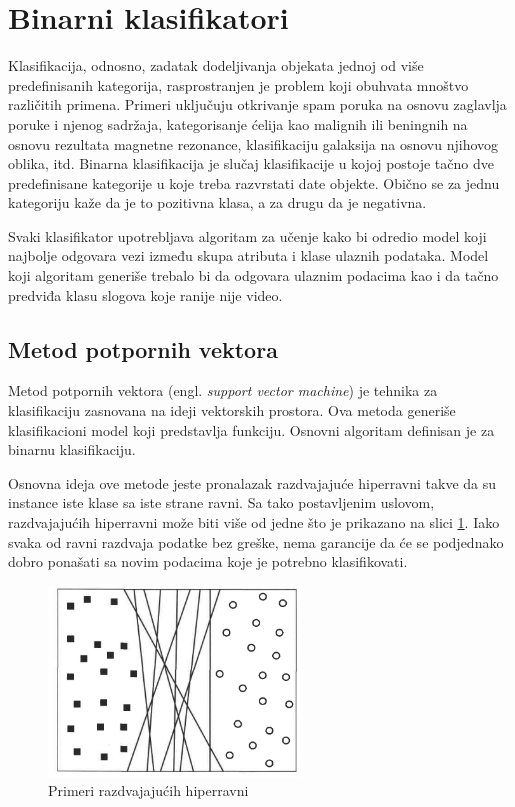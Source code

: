 \section{Binarni klasifikatori}

Klasifikacija, odnosno, zadatak dodeljivanja objekata jednoj od više predefinisanih kategorija, rasprostranjen je problem koji obuhvata mnoštvo različitih primena. Primeri uključuju otkrivanje spam poruka na osnovu zaglavlja poruke i njenog sadržaja, kategorisanje ćelija kao malignih ili beningnih na osnovu rezultata magnetne rezonance, klasifikaciju galaksija na osnovu njihovog oblika, itd. Binarna klasifikacija je slučaj klasifikacije u kojoj postoje tačno dve predefinisane kategorije u koje treba razvrstati date objekte. Obično se za jednu kategoriju kaže da je to pozitivna klasa, a za drugu da je negativna.

Svaki klasifikator upotrebljava algoritam za učenje kako bi odredio model koji najbolje odgovara vezi između skupa atributa i klase ulaznih podataka. Model koji algoritam generiše trebalo bi da odgovara ulaznim podacima kao i da tačno predviđa klasu slogova koje ranije nije video. 


\subsection{Metod potpornih vektora} 

Metod potpornih vektora (engl. \textit{support vector machine}) je tehnika za klasifikaciju zasnovana na ideji vektorskih prostora. Ova metoda generiše klasifikacioni model koji predstavlja funkciju. Osnovni algoritam definisan je za binarnu klasifikaciju.

Osnovna ideja ove metode jeste pronalazak razdvajajuće hiperravni takve da su instance iste klase sa iste strane ravni. Sa tako postavljenim uslovom, razdvajajućih hiperravni može biti više od jedne što je prikazano na slici \ref{fig:svm1}. Iako svaka od ravni razdvaja podatke bez greške, nema garancije da će se podjednako dobro ponašati sa novim podacima koje je potrebno klasifikovati. 


\begin{figure}[H]
	\centering
	\includegraphics[width=0.6\textwidth]{Figures/svm1.png}
	\caption{Primeri razdvajajućih hiperravni \cite{introDM}}
	\label{fig:svm1}
\end{figure}


